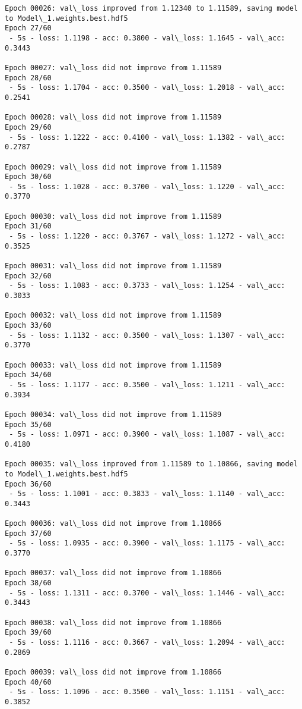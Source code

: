 \documentclass[11pt]{article}
\begin{document}
\begin{Verbatim}[commandchars=\\\{\}]
Epoch 00026: val\_loss improved from 1.12340 to 1.11589, saving model to Model\_1.weights.best.hdf5
Epoch 27/60
 - 5s - loss: 1.1198 - acc: 0.3800 - val\_loss: 1.1645 - val\_acc: 0.3443

Epoch 00027: val\_loss did not improve from 1.11589
Epoch 28/60
 - 5s - loss: 1.1704 - acc: 0.3500 - val\_loss: 1.2018 - val\_acc: 0.2541

Epoch 00028: val\_loss did not improve from 1.11589
Epoch 29/60
 - 5s - loss: 1.1222 - acc: 0.4100 - val\_loss: 1.1382 - val\_acc: 0.2787

Epoch 00029: val\_loss did not improve from 1.11589
Epoch 30/60
 - 5s - loss: 1.1028 - acc: 0.3700 - val\_loss: 1.1220 - val\_acc: 0.3770

Epoch 00030: val\_loss did not improve from 1.11589
Epoch 31/60
 - 5s - loss: 1.1220 - acc: 0.3767 - val\_loss: 1.1272 - val\_acc: 0.3525

Epoch 00031: val\_loss did not improve from 1.11589
Epoch 32/60
 - 5s - loss: 1.1083 - acc: 0.3733 - val\_loss: 1.1254 - val\_acc: 0.3033

Epoch 00032: val\_loss did not improve from 1.11589
Epoch 33/60
 - 5s - loss: 1.1132 - acc: 0.3500 - val\_loss: 1.1307 - val\_acc: 0.3770

Epoch 00033: val\_loss did not improve from 1.11589
Epoch 34/60
 - 5s - loss: 1.1177 - acc: 0.3500 - val\_loss: 1.1211 - val\_acc: 0.3934

Epoch 00034: val\_loss did not improve from 1.11589
Epoch 35/60
 - 5s - loss: 1.0971 - acc: 0.3900 - val\_loss: 1.1087 - val\_acc: 0.4180

Epoch 00035: val\_loss improved from 1.11589 to 1.10866, saving model to Model\_1.weights.best.hdf5
Epoch 36/60
 - 5s - loss: 1.1001 - acc: 0.3833 - val\_loss: 1.1140 - val\_acc: 0.3443

Epoch 00036: val\_loss did not improve from 1.10866
Epoch 37/60
 - 5s - loss: 1.0935 - acc: 0.3900 - val\_loss: 1.1175 - val\_acc: 0.3770

Epoch 00037: val\_loss did not improve from 1.10866
Epoch 38/60
 - 5s - loss: 1.1311 - acc: 0.3700 - val\_loss: 1.1446 - val\_acc: 0.3443

Epoch 00038: val\_loss did not improve from 1.10866
Epoch 39/60
 - 5s - loss: 1.1116 - acc: 0.3667 - val\_loss: 1.2094 - val\_acc: 0.2869

Epoch 00039: val\_loss did not improve from 1.10866
Epoch 40/60
 - 5s - loss: 1.1096 - acc: 0.3500 - val\_loss: 1.1151 - val\_acc: 0.3852


\end{Verbatim}
\end{document}
